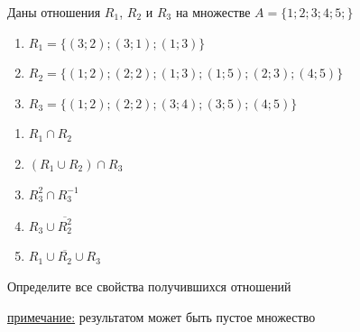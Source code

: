 \question
Даны отношения $R_1$, $R_2$ и $R_3$ на множестве $A = \{1; 2; 3; 4; 5;\}$ 
\begin{enumerate}
	\renewcommand{\labelenumi}{\alph{enumi})}
	\item $R_1 = \{(3; 2); (3; 1); (1; 3)\}$
	\item $R_2 = \{(1; 2); (2; 2); (1; 3); (1; 5); (2; 3); (4; 5)\}$
	\item $R_3 = \{(1; 2); (2; 2); (3; 4); (3; 5); (4; 5)\}$
\end{enumerate}

\begin{enumerate}
	\renewcommand{\labelenumi}{\alph{enumi})}
	\item $R_1 \cap R_2$
	\item $(R_1 \cup R_2) \cap R_3$
	\item $R_3^2 \cap R_3^{-1}$
	\item $R_3 \cup \overline{R_2^2}$
	\item $R_1 \cup \overline{R_2} \cup R_3$
\end{enumerate}

Определите все свойства получившихся отношений

\underline{примечание:} результатом может быть пустое множество